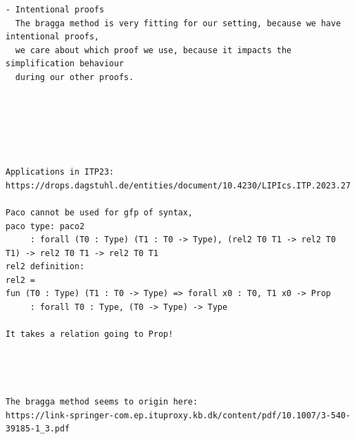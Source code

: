 \documentclass[a4paper,UKenglish,cleveref, autoref, thm-restate]{lipics-v2021}
\begin{document}
\begin{verbatim}
- Intentional proofs
  The bragga method is very fitting for our setting, because we have intentional proofs,
  we care about which proof we use, because it impacts the simplification behaviour 
  during our other proofs. 






Applications in ITP23: https://drops.dagstuhl.de/entities/document/10.4230/LIPIcs.ITP.2023.27

Paco cannot be used for gfp of syntax,
paco type: paco2
     : forall (T0 : Type) (T1 : T0 -> Type), (rel2 T0 T1 -> rel2 T0 T1) -> rel2 T0 T1 -> rel2 T0 T1
rel2 definition:
rel2 =
fun (T0 : Type) (T1 : T0 -> Type) => forall x0 : T0, T1 x0 -> Prop
     : forall T0 : Type, (T0 -> Type) -> Type

It takes a relation going to Prop!




The bragga method seems to origin here:
https://link-springer-com.ep.ituproxy.kb.dk/content/pdf/10.1007/3-540-39185-1_3.pdf


\end{verbatim}
\end{document}
